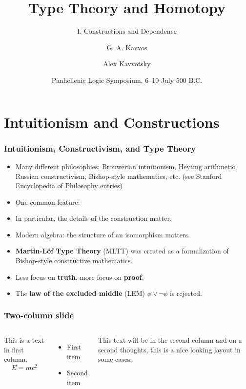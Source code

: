 \documentclass{beamer} %
\title{Type Theory and Homotopy}
\subtitle{I. Constructions and Dependence}
\author{
  G. A. Kavvos \inst{1}
  \and
  Alex Kavvotsky \inst{2}
}
\institute{
  \inst{1} University of Bristol
  \inst{2} Technological University of Elbonia
}
\date{Panhellenic Logic Symposium, 6--10 July 500 B.C.}
\begin{document}
\frame{\titlepage}


\section{Intuitionism and Constructions}

\begin{frame}
  \frametitle{Intuitionism, Constructivism, and Type Theory}
  
  \begin{itemize}
    \item Many different philosophies: Brouwerian intuitionism, Heyting
      arithmetic, Russian constructivism, Bishop-style mathematics, etc. (see
      Stanford Encyclopedia of Philosophy entries)

    \item One common feature:
      \begin{center}
      \end{center}
      
    \item In particular, the details of the construction matter.
      
    \item Modern algebra: the structure of an isomorphism matters.

    \item \textbf{Martin-L\"of Type Theory} (MLTT) was created as a
      formalization of Bishop-style constructive mathematics.
      
    \item Less focus on \textbf{truth}, more focus on \textbf{proof}.

    \item The \textbf{law of the excluded middle} (LEM) $\phi \lor \lnot \phi$
      is rejected.
  \end{itemize}
\end{frame}

\begin{frame}
  \frametitle{Two-column slide}
  \begin{columns}
  This is a text in first column.
  $$E=mc^2$$
  \begin{itemize}
  \item First item
  \item Second item
  \end{itemize}
  
  This text will be in the second column
  and on a second thoughts, this is a nice looking
  layout in some cases.
  \end{columns}
  \end{frame}
  
\end{document}
